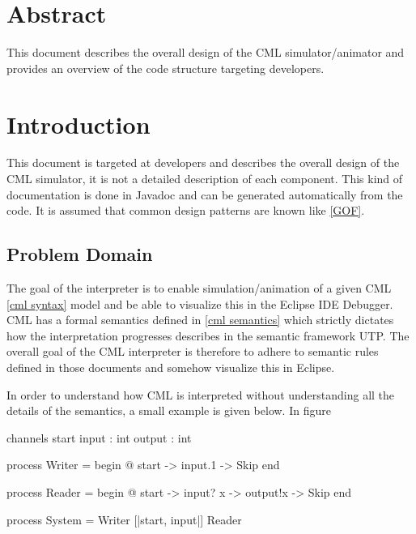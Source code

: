 \documentclass[a4paper, 10pt]{include/compassreport}   %
\begin{document}
\maketitle


\section*{Abstract}
\label{sec:abstract}

This document describes the overall design of the CML
simulator/animator and provides an overview of the code structure
targeting developers.

\newpage

\tableofcontents
\newpage

\section{Introduction}\label{sec:introduction}
This document is targeted at developers and describes the overall
design of the CML simulator, it is not a detailed description of each
component. This kind of documentation is done in Javadoc and can be
generated automatically from the code. It is assumed that common
design patterns are known like \ref{GOF}.

\subsection{Problem Domain}
The goal of the interpreter is to enable simulation/animation of a
given CML \ref{cml syntax} model and be able to visualize this in the
Eclipse IDE Debugger. CML has a formal semantics defined in \ref{cml semantics}
which strictly dictates how the interpretation progresses describes in
the semantic framework UTP. The overall goal of the CML interpreter is
therefore to adhere to semantic rules defined in those
documents and somehow visualize this in Eclipse.

In order to understand how CML is interpreted without understanding
all the details of the semantics, a small example is given below. In
figure

\begin{cml}[caption=Coordinating a reader and writer process,tabsize=2, label={lbl:process:B}]
channels
start 
input : int
output : int

process Writer = 
begin
 @ start -> input.1 -> Skip 
end

process Reader = 
begin
 @ start -> input? x -> output!x -> Skip 
end

process System = Writer [|{start, input}|] Reader
\end{cml}
\end{document}
